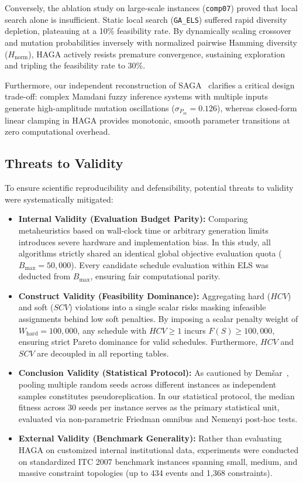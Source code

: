 \documentclass[journal]{IEEEtran}
\begin{document}
Conversely, the ablation study on large-scale instances (\texttt{comp07}) proved that local search alone is insufficient. Static local search (\texttt{GA\_ELS}) suffered rapid diversity depletion, plateauing at a 10\% feasibility rate. By dynamically scaling crossover and mutation probabilities inversely with normalized pairwise Hamming diversity ($H_{\text{norm}}$), HAGA actively resists premature convergence, sustaining exploration and tripling the feasibility rate to 30\%.

Furthermore, our independent reconstruction of SAGA~\cite{pamungkas2025saga} clarifies a critical design trade-off: complex Mamdani fuzzy inference systems with multiple inputs generate high-amplitude mutation oscillations ($\sigma_{P_m} = 0.126$), whereas closed-form linear clamping in HAGA provides monotonic, smooth parameter transitions at zero computational overhead.

\subsection{Threats to Validity}
To ensure scientific reproducibility and defensibility, potential threats to validity were systematically mitigated:
\begin{itemize}
    \item \textbf{Internal Validity (Evaluation Budget Parity):} Comparing metaheuristics based on wall-clock time or arbitrary generation limits introduces severe hardware and implementation bias. In this study, all algorithms strictly shared an identical global objective evaluation quota ($B_{\max} = 50,000$). Every candidate schedule evaluation within ELS was deducted from $B_{\max}$, ensuring fair computational parity.
    \item \textbf{Construct Validity (Feasibility Dominance):} Aggregating hard ($HCV$) and soft ($SCV$) violations into a single scalar risks masking infeasible assignments behind low soft penalties. By imposing a scalar penalty weight of $W_{\text{hard}} = 100,000$, any schedule with $HCV \ge 1$ incurs $F(S) \ge 100,000$, ensuring strict Pareto dominance for valid schedules. Furthermore, $HCV$ and $SCV$ are decoupled in all reporting tables.
    \item \textbf{Conclusion Validity (Statistical Protocol):} As cautioned by Dem{\v{s}}ar~\cite{demsar2006statistical}, pooling multiple random seeds across different instances as independent samples constitutes pseudoreplication. In our statistical protocol, the median fitness across 30 seeds per instance serves as the primary statistical unit, evaluated via non-parametric Friedman omnibus and Nemenyi post-hoc tests.
    \item \textbf{External Validity (Benchmark Generality):} Rather than evaluating HAGA on customized internal institutional data, experiments were conducted on standardized ITC 2007 benchmark instances spanning small, medium, and massive constraint topologies (up to 434 events and 1,368 constraints).
\end{itemize}
\end{document}
